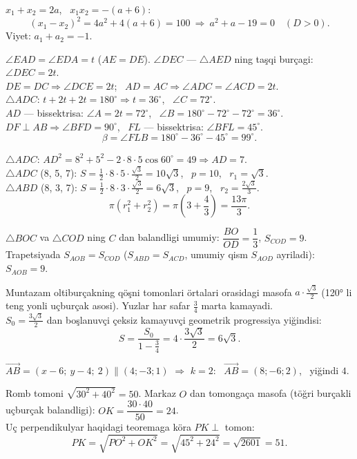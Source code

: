 $x_1+x_2=2a$, \ $x_1x_2=-(a+6)$:
\[(x_1-x_2)^2=4a^2+4(a+6)=100\ \Rightarrow\ a^2+a-19=0\quad(D>0).\]
Viyet: $a_1+a_2=-1$.

$\angle EAD=\angle EDA=t$ ($AE=DE$). $\angle DEC$ — $\triangle AED$ ning taşqi burçagi: $\angle DEC=2t$.\\
$DE=DC\Rightarrow \angle DCE=2t$; \ $AD=AC\Rightarrow\angle ADC=\angle ACD=2t$.\\
$\triangle ADC$: $t+2t+2t=180^\circ\Rightarrow t=36^\circ$, \ $\angle C=72^\circ$.\\
$AD$ — bissektrisa: $\angle A=2t=72^\circ$, \ $\angle B=180^\circ-72^\circ-72^\circ=36^\circ$.\\
$DF\perp AB\Rightarrow\angle BFD=90^\circ$, \ $FL$ — bissektrisa: $\angle BFL=45^\circ$.
\[\beta=\angle FLB=180^\circ-36^\circ-45^\circ=99^\circ.\]

$\triangle ADC$: $AD^2=8^2+5^2-2\cdot8\cdot5\cos60^\circ=49\Rightarrow AD=7$.\\
$\triangle ADC$ (8, 5, 7): $S=\frac12\cdot8\cdot5\cdot\frac{\sqrt3}2=10\sqrt3$, \ $p=10$, \ $r_1=\sqrt3$.\\
$\triangle ABD$ (8, 3, 7): $S=\frac12\cdot8\cdot3\cdot\frac{\sqrt3}2=6\sqrt3$, \ $p=9$, \ $r_2=\frac{2\sqrt3}3$.
\[\pi\left(r_1^2+r_2^2\right)=\pi\left(3+\frac43\right)=\frac{13\pi}3.\]

$\triangle BOC$ va $\triangle COD$ ning $C$ dan balandligi umumiy: $\dfrac{BO}{OD}=\dfrac13$, $S_{COD}=9$.\\
Trapetsiyada $S_{AOB}=S_{COD}$ ($S_{ABD}=S_{ACD}$, umumiy qism $S_{AOD}$ ayriladi): $S_{AOB}=9$.

Muntazam oltiburçakning qöşni tomonlari örtalari orasidagi masofa $a\cdot\frac{\sqrt3}2$ (120° li teng yonli uçburçak asosi). Yuzlar har safar $\frac34$ marta kamayadi.\\
$S_0=\frac{3\sqrt3}2$ dan boşlanuvçi çeksiz kamayuvçi geometrik progressiya yiğindisi:
\[S=\frac{S_0}{1-\frac34}=4\cdot\frac{3\sqrt3}2=6\sqrt3.\]

$\overrightarrow{AB}=(x-6;\ y-4;\ 2)\parallel(4;-3;1)$ $\Rightarrow$ $k=2$: \ $\overrightarrow{AB}=(8;-6;2)$, \ yiğindi $4$.

Romb tomoni $\sqrt{30^2+40^2}=50$. Markaz $O$ dan tomongaça masofa (töğri burçakli uçburçak balandligi): $OK=\dfrac{30\cdot40}{50}=24$.\\
Uç perpendikulyar haqidagi teoremaga köra $PK\perp$ tomon:
\[PK=\sqrt{PO^2+OK^2}=\sqrt{45^2+24^2}=\sqrt{2601}=51.\]


